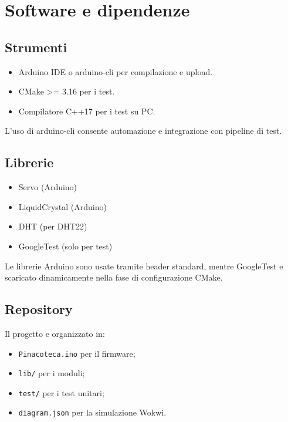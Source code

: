 \chapter{Software e dipendenze}

\section{Strumenti}
\begin{itemize}
  \item Arduino IDE o arduino-cli per compilazione e upload.
  \item CMake >= 3.16 per i test.
  \item Compilatore C++17 per i test su PC.
\end{itemize}
L'uso di arduino-cli consente automazione e integrazione con pipeline di test.

\section{Librerie}
\begin{itemize}
  \item Servo (Arduino)
  \item LiquidCrystal (Arduino)
  \item DHT (per DHT22)
  \item GoogleTest (solo per test)
\end{itemize}
Le librerie Arduino sono usate tramite header standard, mentre GoogleTest e scaricato dinamicamente nella fase di configurazione CMake.

\section{Repository}
Il progetto e organizzato in:
\begin{itemize}
  \item \texttt{Pinacoteca.ino} per il firmware;
  \item \texttt{lib/} per i moduli;
  \item \texttt{test/} per i test unitari;
  \item \texttt{diagram.json} per la simulazione Wokwi.
\end{itemize}
